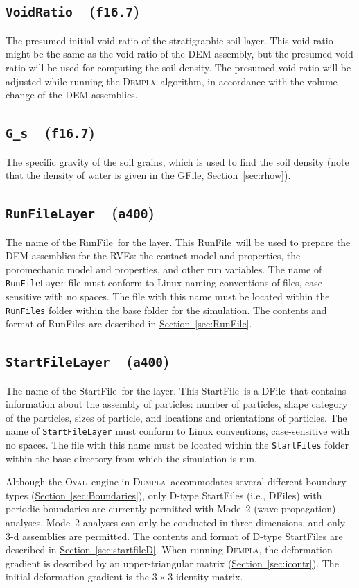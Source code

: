 \documentclass[letterpaper,11pt]{article}
\newcommand{\Oval}{\textsc{Oval}}
\newcommand{\Dempla}{\textsc{Dempla}}
\newcommand{\Var}[2]{\texttt{#1}\ \  (\texttt{#2})}
\newcommand{\RunFile}{\textsf{RunFile}}
\newcommand{\StartFile}{\textsf{StartFile}}
\newcommand{\DFile}{\textsf{DFile}}
\newcommand{\GFile}{\textsf{GFile}}
\begin{document}
\subsection[\texttt{VoidRatio}]{\Var{VoidRatio}{f16.7}}%
\label{sec:VoidRatio}
The presumed initial void ratio of the stratigraphic soil
layer.
This void ratio might be the same as the void ratio of the
DEM assembly,
but the presumed void ratio will be used for computing
the soil density.
The presumed void ratio will be adjusted while running
the \Dempla\ algorithm, in accordance with the volume
change of the DEM assemblies.
%
\subsection[\texttt{G\_s}]{\Var{G\_s}{f16.7}}%
\label{sec:G_s}
The specific gravity of the soil grains,
which is used to find the soil density
(note that the density of water is given in the
\GFile, 
\hyperref[sec:rhow]{Section~\ref*{sec:rhow}}).
%
\subsection[\texttt{RunFileLayer}]{\Var{RunFileLayer}{a400}}%
\label{sec:RunFileLayer}
The name of the \RunFile\ for the layer.
This \RunFile\ will be used to prepare the DEM assemblies
for the RVEs:
the contact model and properties,
the poromechanic model and properties,
and other run variables.
The name of \texttt{RunFileLayer} file must conform to Linux
naming conventions of files, case-sensitive with no spaces.
The file with this name must be located within the
\texttt{RunFiles} folder within the base folder for the
simulation.
The contents and format
of \RunFile s are described in
\hyperref[sec:RunFile]{Section~\ref*{sec:RunFile}}.
%
\subsection[\texttt{StartFileLayer}]{\Var{StartFileLayer}{a400}}%
\label{sec:StartFileLayer}
The name of the \StartFile\ for the layer.
This \StartFile\ is a \DFile\ that
contains information about the assembly
of particles:
number of particles, shape category of the particles,
sizes of particle, and locations and orientations of particles.
The name of \texttt{StartFileLayer} must conform to Linux
conventions, case-sensitive with no spaces.
The file with this name must be located within the
\texttt{StartFiles} folder within the base directory
from which the
simulation is run.
%
\par
Although the \Oval\ engine in \Dempla\ accommodates
several different boundary types
(\hyperref[sec:Boundaries]{Section~\ref*{sec:Boundaries}}),
only D-type \StartFile s (i.e., \DFile s)
with periodic boundaries
are currently permitted with Mode~2 (wave propagation)
analyses.
Mode~2 analyses can only be conducted in three dimensions,
and only 3-d assemblies are permitted.
The contents and format
of D-type \StartFile s are described
in \hyperref[sec:startfileD]{Section~\ref*{sec:startfileD}}.
When running \Dempla, the deformation gradient
is described by an upper-triangular matrix
(\hyperref[sec:icontr]{Section~\ref*{sec:icontr}}).
The initial deformation gradient is the $3\times 3$ identity matrix.
%
%
\end{document}
